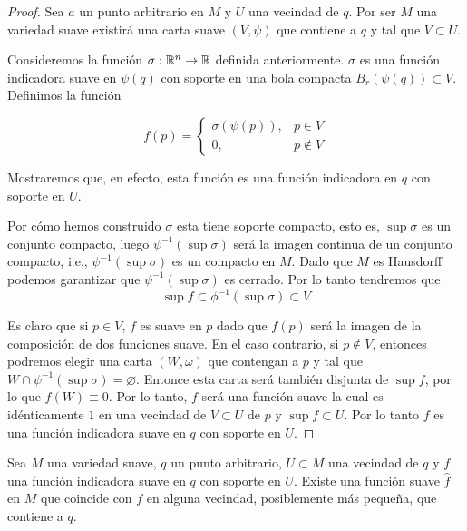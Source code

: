 \begin{proof}
	Sea $a$ un punto arbitrario en $M$ y $U$ una vecindad de $q$. Por ser $M$ una variedad suave existirá una carta suave $(V,\psi)$ que contiene a $q$ y tal que $V \subset U$.

	Consideremos la función $\sigma: \mathbb{R}^n \to \mathbb{R}$ definida anteriormente. $\sigma$ es una función indicadora suave en $\psi(q)$ con soporte en una bola compacta $B_r(\psi(q)) \subset V$. Definimos la función

	\[
		f(p) = \begin{cases}
			\sigma(\psi(p)), & p \in V    \\
			0,               & p \notin V
		\end{cases}
	\]

	Mostraremos que, en efecto, esta función es una función indicadora en $q$ con soporte en $U$.

	Por cómo hemos construido $\sigma$ esta tiene soporte compacto, esto es, $\sup \sigma$ es un conjunto compacto, luego $\psi^{-1}(\sup \sigma)$ será la imagen continua de un conjunto compacto, i.e., $\psi^{-1}(\sup \sigma)$ es un compacto en $M$. Dado que $M$ es Hausdorff podemos garantizar que $\psi^{-1} (\sup \sigma)$ es cerrado. Por lo tanto tendremos que
	\[
		\sup f \subset \phi^{-1} (\sup \sigma) \subset V
	\]

	Es claro que si $p \in V$, $f$ es suave en $p$ dado que $f(p)$ será la imagen de la composición de dos funciones suave. En el caso contrario, si $p \notin V$, entonces podremos elegir una carta $(W,\omega)$ que contengan a $p$ y tal que $W \cap \psi^{-1}(\sup \sigma) = \varnothing$. Entonce esta carta será también disjunta de $\sup f$, por lo que $f(W) \equiv 0$. Por lo tanto, $f$ será una función suave la cual es idénticamente $1$ en una vecindad de $V \subset U$ de $p$ y $\sup f \subset U$. Por lo tanto $f$ es una función indicadora suave en $q$ con soporte en $U$.
\end{proof}

\begin{lemma}
	Sea $M$ una variedad suave, $q$ un punto arbitrario, $U \subset M$ una vecindad de $q$ y $f$ una función indicadora suave en $q$ con soporte en $U$. Existe una función suave $\hat{f}$ en $M$ que coincide con $f$ en alguna vecindad, posiblemente más pequeña, que contiene a $q$.
\end{lemma}

